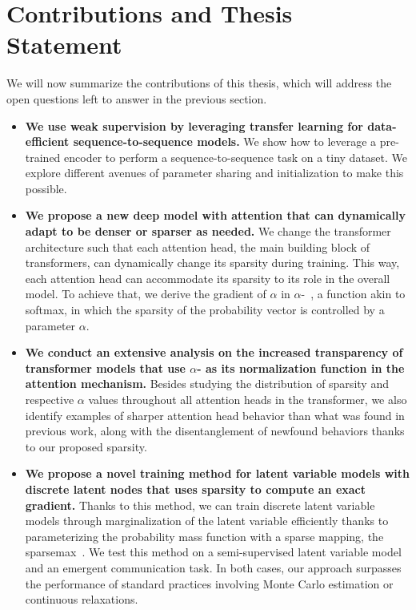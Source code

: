 \section{Contributions and Thesis Statement}
\label{sec:int_contributions}

\noindent We will now summarize the contributions of this thesis, which will
address the open questions left to answer in the previous section.

\begin{itemize}

    \item \textbf{We use weak supervision by leveraging transfer learning
              for data-efficient sequence-to-sequence models.} We show how to
          leverage a pre-trained encoder to perform a
          sequence-to-sequence task on a tiny dataset. We explore different
          avenues of parameter sharing and initialization to make this
          possible.


    \item \textbf{We propose a new deep model with attention that can
              dynamically adapt to be denser or sparser as needed.} We change the
          transformer architecture such that each attention head, the main
          building block of transformers, can dynamically change its sparsity
          during training. This way, each attention head can accommodate its
          sparsity to its role in the overall model. To achieve that, we derive
          the gradient of $\alpha$ in $\alpha$-\entmaxtext{}~\citep{entmax}, a
          function akin to softmax, in which the sparsity of the probability
          vector is controlled by a parameter $\alpha$.

    \item \textbf{We conduct an extensive analysis on the increased
              transparency of transformer models that use {\boldmath
                      $\alpha$}-\entmaxtext{} as its normalization function in the
              attention mechanism.}
          Besides studying the distribution of sparsity and respective $\alpha$ values
          throughout all attention heads in the transformer, we also identify
          examples of sharper attention head behavior than what was found in
          previous work, along with the disentanglement of newfound behaviors
          thanks to our proposed sparsity.

    \item \textbf{We propose a novel training method for latent variable
              models with discrete latent nodes that uses sparsity to compute an
              exact gradient.} Thanks to this method, we can train discrete latent
          variable models through marginalization of the latent variable
          efficiently thanks to parameterizing the probability mass function
          with a sparse mapping, the sparsemax~\citep{sparsemax}. We test this
          method on a semi-supervised latent variable model and an emergent
          communication task. In both cases, our approach surpasses the
          performance of standard practices involving Monte Carlo estimation or
          continuous relaxations.


\end{itemize}
